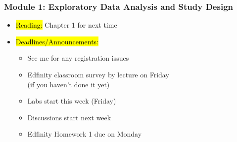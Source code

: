 
\begin{frame}
    \frametitle{Module 1: Exploratory Data Analysis and Study Design}
    \begin{itemize}
        \item \hl{Reading: }Chapter 1 for next time
        \item \hl{Deadlines/Announcements: }
        \begin{itemize}
            \item See me for any registration issues
            \item Edfinity classroom survey by lecture on Friday \\
            (if you haven't done it yet)
            \item Labs start this week (Friday)
            \item Discussions start next week
            \item Edfinity Homework 1 due on Monday
        \end{itemize}
    \end{itemize}
    
\end{frame}
    